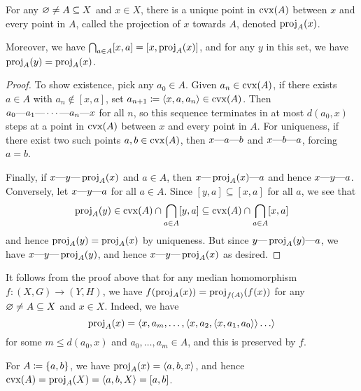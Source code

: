 \documentclass[reqno]{amsart}
\begin{document}
    \begin{lemma}\label{lem:projections}
        For any $\em\neq A\subseteq X$ and $x\in X$, there is a unique point in $\cvx(A)$ between $x$ and every point in $A$, called the $\mathrm{projection}$ of $x$ towards $A$, denoted $\proj_A(x)$.

        Moreover, we have $\bigcap_{a\in A}[x,a]=[x,\proj_A(x)]$, and for any $y$ in this set, we have $\proj_A(y)=\proj_A(x)$.
    \end{lemma}
    \begin{proof}
        To show existence, pick any $a_0\in A$. Given $a_n\in\cvx(A)$, if there exists $a\in A$ with $a_n\not\in[x,a]$, set $a_{n+1}\coloneqq\l\langle x,a,a_n\r\rangle\in\cvx(A)$. Then $a_0\-a_1\-\cdots\-a_n\-x$ for all $n$, so this sequence terminates in at most $d(a_0,x)$ steps at a point in $\cvx(A)$ between $x$ and every point in $A$. For uniqueness, if there exist two such points $a,b\in\cvx(A)$, then $x\-a\-b$ and $x\-b\-a$, forcing $a=b$.

        Finally, if $x\-y\-\proj_A(x)$ and $a\in A$, then $x\-\proj_A(x)\-a$ and hence $x\-y\-a$. Conversely, let $x\-y\-a$ for all $a\in A$. Since $[y,a]\subseteq[x,a]$ for all $a$, we see that
        \begin{equation*}
            \proj_A(y)\in\cvx(A)\cap\bigcap_{a\in A}[y,a]\subseteq\cvx(A)\cap\bigcap_{a\in A}[x,a]
        \end{equation*}
        and hence $\proj_A(y)=\proj_A(x)$ by uniqueness. But since $y\-\proj_A(y)\-a$, we have $x\-y\-\proj_A(y)$, and hence $x\-y\-\proj_A(x)$ as desired.
    \end{proof}

    \begin{remark}\label{rem:projections}
        It follows from the proof above that for any median homomorphism $f:(X,G)\to(Y,H)$, we have $f(\proj_A(x))=\proj_{f(A)}(f(x))$ for any $\em\neq A\subseteq X$ and $x\in X$. Indeed, we have
        \begin{equation*}
            \proj_A(x)=\l\langle x,a_m,\dots,\l\langle x,a_2,\l\langle x,a_1,a_0\r\rangle\r\rangle\dots\r\rangle
        \end{equation*}
        for some $m\leq d(a_0,x)$ and $a_0,\dots,a_m\in A$, and this is preserved by $f$.
    
        For $A\coloneqq\l\{a,b\r\}$, we have $\proj_A(x)=\l\langle a,b,x\r\rangle$, and hence $\cvx(A)=\proj_A(X)=\l\langle a,b,X\r\rangle=[a,b]$.
    \end{remark}
\end{document}
